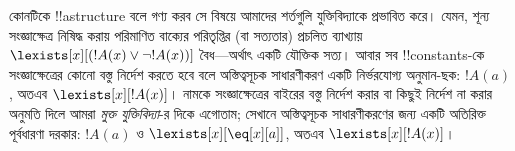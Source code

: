 \documentclass[../../../include/open-logic-section]{subfiles}
\begin{document}
\begin{digress}
কোনটিকে !!a{structure} বলে গণ্য করব সে বিষয়ে আমাদের শর্তগুলি
যুক্তিবিদ্যাকে প্রভাবিত করে। যেমন, শূন্য সংজ্ঞাক্ষেত্র নিষিদ্ধ করায়
পরিমাণিত বাক্যের পরিতৃপ্তির (বা সত্যতার) প্রচলিত ব্যাখ্যায়
$\lexists[x][(!A(x) \lor \lnot !A(x))]$ বৈধ—অর্থাৎ একটি যৌক্তিক সত্য।
আবার সব !!{constant}s-কে সংজ্ঞাক্ষেত্রের কোনো বস্তু নির্দেশ করতে হবে
বলে অস্তিত্বসূচক সাধারণীকরণ একটি নির্ভরযোগ্য অনুমান-ছক: $!A(a)$,
অতএব $\lexists[x][!A(x)]$। নামকে সংজ্ঞাক্ষেত্রের বাইরের বস্তু নির্দেশ
করার বা কিছুই নির্দেশ না করার অনুমতি দিলে আমরা \emph{মুক্ত
যুক্তিবিদ্যা}-র দিকে এগোতাম; সেখানে অস্তিত্বসূচক সাধারণীকরণের জন্য একটি
অতিরিক্ত পূর্বধারণা দরকার: $!A(a)$ ও $\lexists[x][\eq[x][a]]$,
অতএব $\lexists[x][!A(x)]$।
\end{digress}
\end{document}
